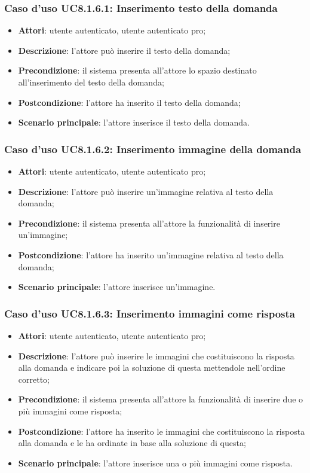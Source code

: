 \subsubsection{Caso d'uso UC8.1.6.1: Inserimento testo della domanda}
\begin{itemize}
	\item\textbf{Attori}: utente autenticato, utente autenticato pro;
	\item\textbf{Descrizione}: l'attore può inserire il testo della domanda;
	\item\textbf{Precondizione}: il sistema presenta all'attore lo spazio destinato all'inserimento del testo della domanda;
	\item \textbf{Postcondizione}: l'attore ha inserito il testo della domanda;
	\item\textbf{Scenario principale}: l'attore inserisce il testo della domanda. 
\end{itemize}

\subsubsection{Caso d'uso UC8.1.6.2: Inserimento immagine della domanda}
\begin{itemize}
	\item\textbf{Attori}: utente autenticato, utente autenticato pro;
	\item\textbf{Descrizione}: l'attore può inserire un'immagine relativa al testo della domanda;
	\item\textbf{Precondizione}: il sistema presenta all'attore la funzionalità di inserire un'immagine;
	\item \textbf{Postcondizione}: l'attore ha inserito un'immagine relativa al testo della domanda;
	\item\textbf{Scenario principale}: l'attore inserisce un'immagine.
\end{itemize}

\subsubsection{Caso d'uso UC8.1.6.3: Inserimento immagini come risposta}
\begin{itemize}
	\item\textbf{Attori}: utente autenticato, utente autenticato pro;
	\item\textbf{Descrizione}: l'attore può inserire le immagini che costituiscono la risposta alla domanda e indicare poi la soluzione di questa mettendole nell'ordine corretto;
	\item\textbf{Precondizione}: il sistema presenta all'attore la funzionalità di inserire due o più immagini come risposta; 
	\item \textbf{Postcondizione}: l'attore ha inserito le immagini che costituiscono la risposta alla domanda e le ha ordinate in base alla soluzione di questa;
	\item\textbf{Scenario principale}: l'attore inserisce una o più immagini come risposta.
\end{itemize}

